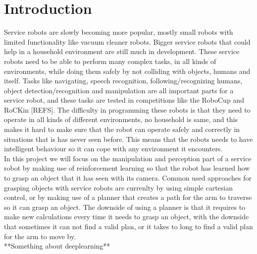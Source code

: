 \section{Introduction}
Service robots are slowly becoming more popular, mostly small robots with limited functionality like vacuum cleaner robots. Bigger service robots that could help in a household environment are still much in development. 
These service robots need to be able to perform many complex tasks, in all kinds of environments, while doing them safely by not colliding with objects, humans and itself.   
Tasks like navigating, speech recognition, following/recognizing humans, object detection/recognition and manipulation are all important parts for a service robot, 
and these tasks are tested in competitions like the RoboCup and RoCKin [REFS]. The difficulty in programming these robots is that they need to operate in all kinds of different environments, no household is same, and this makes it hard
to make sure that the robot can operate safely and correctly in situations that is has never seen before. This means that the robots needs to have intelligent behaviour so it can cope with any environment it encounters. \\
In this project we will focus on the manipulation and perception part of a service robot by making use of reinforcement learning so that the robot has learned how to grasp an object that it has seen with its camera.  
Common used approaches for grasping objects with service robots are currenlty by using simple cartesian control, or by making use of a planner that creates a path for the arm to traverse so it can grasp an object. 
The downside of using a planner is that it requires to make new calculations every time it needs to grasp an object, with the downside that sometimes it can not find a valid plan, or it takes to long to find a valid plan
for the arm to move by. \\
**Something about deeplearning**



%
 



